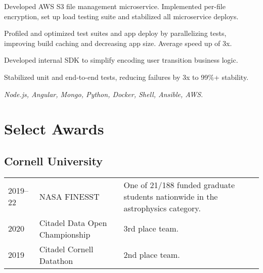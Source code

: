 \documentclass[]{yubo-resume-openfont}
\begin{document}
\begin{minipage}[t]{0.66\textwidth}
\vspace{\topsep} %
\begin{tightemize}
    \item Developed AWS S3 file management microservice. Implemented
        per-file encryption, set up load testing suite and stabilized all
        microservice deploys.
    \item Profiled and optimized test suites and app deploy by parallelizing
        tests, improving build caching and decreasing app size. Average
        speed up of 3x.
    \item Developed internal SDK to simplify encoding user transition
        business logic.
    \item Stabilized unit and end-to-end tests, reducing failures by 3x to
        99\%+ stability.
    \item \emph{Node.js, Angular, Mongo, Python, Docker, Shell, Ansible,
        AWS}.
\end{tightemize}


\section{Select Awards}
\subsection{Cornell University}
\begin{tabular}{p{50pt}p{80pt}p{7.5cm}}
    2019--22 & NASA FINESST & One of 21/188 funded graduate students nationwide
    in the astrophysics category.\\
    2020 & Citadel Data Open Championship & 3rd place team.\\
    2019 & Citadel Cornell Datathon & 2nd place team.
\end{tabular}
\sectionsep

\end{minipage}
\end{document}
